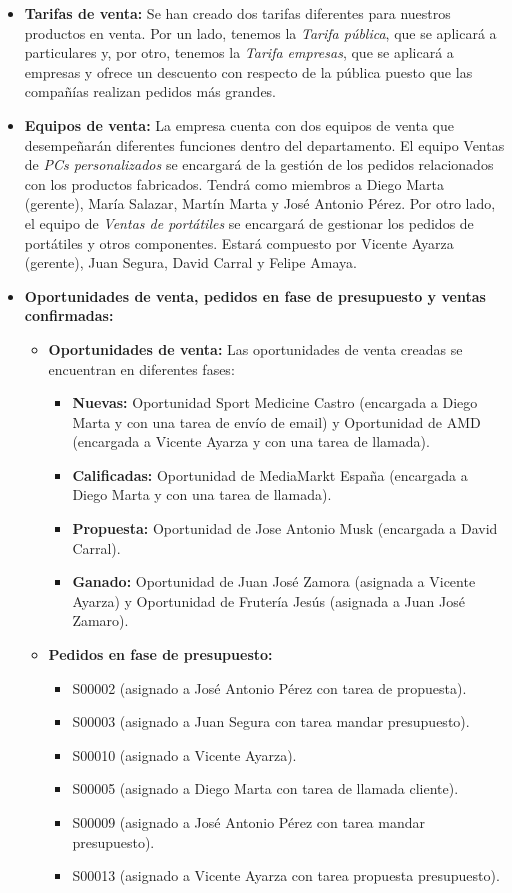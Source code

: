 \begin{itemize}
    \item \textbf{Tarifas de venta:} Se han creado dos tarifas diferentes para nuestros productos en venta. Por un lado, tenemos la \textit{Tarifa pública}, que se aplicará a particulares y, por otro, tenemos la \textit{Tarifa empresas}, que se aplicará a empresas y ofrece un descuento con respecto de la pública puesto que las compañías realizan pedidos más grandes.
    \item \textbf{Equipos de venta:} La empresa cuenta con dos equipos de venta que desempeñarán diferentes funciones dentro del departamento. El equipo Ventas de \textit{PCs personalizados} se encargará de la gestión de los pedidos relacionados con los productos fabricados. Tendrá como miembros a Diego Marta (gerente), María Salazar, Martín Marta y José Antonio Pérez. Por otro lado, el equipo de \textit{Ventas de portátiles} se encargará de gestionar los pedidos de portátiles y otros componentes. Estará compuesto por Vicente Ayarza (gerente), Juan Segura, David Carral y Felipe Amaya.
    \item \textbf{Oportunidades de venta, pedidos en fase de presupuesto y ventas confirmadas:}
    \begin{itemize}
        \item \textbf{Oportunidades de venta:} Las oportunidades de venta creadas se encuentran en diferentes fases:
        \begin{itemize}
            \item \textbf{Nuevas:} Oportunidad Sport Medicine Castro (encargada a Diego Marta y con una tarea de envío de email) y Oportunidad de AMD (encargada a Vicente Ayarza y con una tarea de llamada).
            \item \textbf{Calificadas:} Oportunidad de MediaMarkt España (encargada a Diego Marta y con una tarea de llamada).
            \item \textbf{Propuesta:} Oportunidad de Jose Antonio Musk (encargada a David Carral).
            \item \textbf{Ganado:} Oportunidad de Juan José Zamora (asignada a Vicente Ayarza) y Oportunidad de Frutería Jesús (asignada a Juan José Zamaro).
        \end{itemize}
        \item \textbf{Pedidos en fase de presupuesto:} 
        \begin{itemize}
            \item S00002 (asignado a José Antonio Pérez con tarea de propuesta).
            \item S00003 (asignado a Juan Segura con tarea mandar presupuesto).
            \item S00010 (asignado a Vicente Ayarza).
            \item S00005 (asignado a Diego Marta con tarea de llamada cliente).
            \item S00009 (asignado a José Antonio Pérez con tarea mandar presupuesto).
            \item S00013 (asignado a Vicente Ayarza con tarea propuesta presupuesto).


\end{itemize}
\end{itemize}
\end{itemize}
